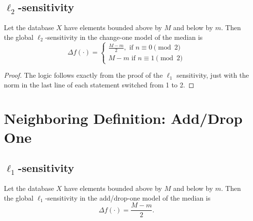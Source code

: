 \documentclass[11pt]{scrartcl} %
\begin{document}
\subsection{$\ell_2$-sensitivity}
\begin{theorem}
	Let the database $X$ have elements bounded above by $M$ and below by $m$.
	Then the global $\ell_2$-sensitivity in the change-one model of the median is
	\[
		\Delta f(\cdot) =
			\begin{cases}
				\frac{M - m}{2}, \text{ if } n \equiv 0 \pmod{2} \\
				M-m \text{ if } n \equiv 1 \pmod{2}
			\end{cases}
	\]
\end{theorem}

\begin{proof}
	The logic follows exactly from the proof of the $\ell_1$ sensitivity,
	just with the norm in the last line of each statement switched from 1 to 2.
\end{proof}

\section{Neighboring Definition: Add/Drop One}

\subsection{$\ell_1$-sensitivity}

\begin{theorem}
Let the database $X$ have elements bounded above by $M$ and below by $m$. Then the global $\ell_1$-sensitivity in the add/drop-one model of the median is
$$ \Delta f(\cdot) = \frac{M-m}{2}.$$
\end{theorem}
\end{document}
